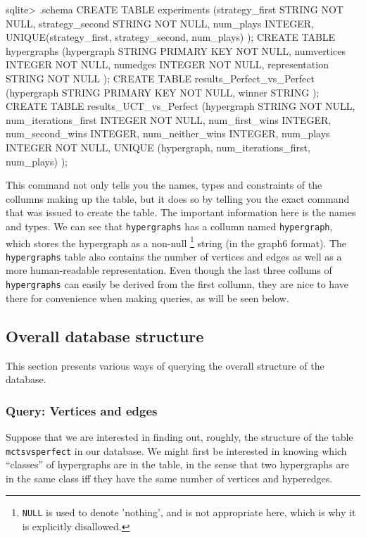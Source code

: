 \begin{minipage}{\linewidth}
\begin{code}
sqlite> .schema
CREATE TABLE experiments
(strategy_first STRING NOT NULL,
 strategy_second STRING NOT NULL,
 num_plays INTEGER,
 UNIQUE(strategy_first, strategy_second, num_plays)
);
CREATE TABLE hypergraphs
(hypergraph STRING PRIMARY KEY NOT NULL,
 numvertices INTEGER NOT NULL,
 numedges INTEGER NOT NULL,
 representation STRING NOT NULL
);
CREATE TABLE results_Perfect_vs_Perfect
(hypergraph STRING PRIMARY KEY NOT NULL,
 winner STRING
);
CREATE TABLE results_UCT_vs_Perfect
(hypergraph STRING NOT NULL,
 num_iterations_first INTEGER NOT NULL,
 num_first_wins INTEGER,
 num_second_wins INTEGER,
 num_neither_wins INTEGER,
 num_plays INTEGER NOT NULL,
 UNIQUE (hypergraph, num_iterations_first, num_plays)
);
\end{code}
\end{minipage}
This command not only tells you the names, types and constraints of the collumns making up the table, but it does so by telling you the exact command that was issued to create the table.
The important information here is the names and types.
We can see that \texttt{hypergraphs} has a collumn named \texttt{hypergraph}, which stores the hypergraph as a non-null \footnote{\texttt{NULL} is used to denote 'nothing', and is not appropriate here, which is why it is explicitly disallowed.} string (in the graph6 format). 
The \texttt{hypergraphs} table also contains the number of vertices and edges as well as a more human-readable representation.
Even though the last three collums of \texttt{hypergraphs} can easily be derived from the first collumn, they are nice to have there for convenience when making queries, as will be seen below.


\subsection{Overall database structure}


This section presents various ways of querying the overall structure of the database.

\subsubsection{Query: Vertices and edges}

Suppose that we are interested in finding out, roughly, the structure of the table \texttt{mctsvsperfect} in our database.
We might first be interested in knowing which ``classes'' of hypergraphs are in the table, in the sense that two hypergraphs are in the same class iff they have the same number of vertices and hyperedges.

